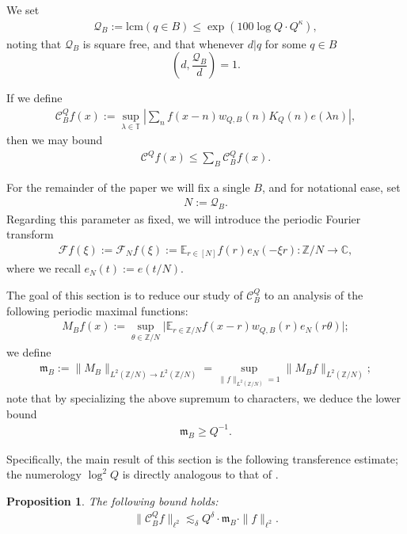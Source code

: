 \documentclass[12pt]{amsart}
\numberwithin{equation}{section}
\newtheorem{proposition}[theorem]{Proposition}
\theoremstyle{definition}
\begin{document}
We set
\begin{align}
\mathcal{Q}_B := \text{lcm}(q \in B) \leq \exp(100 \log Q \cdot Q^\kappa),
\end{align}
noting that $\mathcal{Q}_B$ is square free, and that whenever $d|q$ for some $q \in B$
\[ (d, \frac{\mathcal{Q}_B}{d}) =1.\]

If we define
\begin{align}
    \mathcal{C}^{Q}_Bf(x):= \sup_{\lambda \in \mathbb{T}}| \sum_n  f(x-n) w_{Q,B}(n)K_Q(n) e(\lambda n)|,
\end{align}
then we may bound
\begin{align}
    \mathcal{C}^Q f(x) \leq \sum_B \mathcal{C}^{Q}_Bf(x).
\end{align}

For the remainder of the paper we will fix a single $B$, and for notational ease, set
\begin{align}
    N := \mathcal{Q}_B.
\end{align}
Regarding this parameter as fixed, we will introduce the periodic Fourier transform
\begin{align}
\mathcal{F} f(\xi) := \mathcal{F}_N f(\xi) := \mathbb{E}_{r \in [N]} f(r) e_N(-\xi r) : \mathbb{Z}/N \to \mathbb{C},
\end{align}
where we recall $e_N(t) := e(t/N)$.

The goal of this section is to reduce our study of $\mathcal{C}^Q_B$ to an analysis of the following periodic maximal functions:
\begin{align}
    M_B f(x) := \sup_{\theta \in \mathbb{Z}/N} \big| \mathbb{E}_{r \in \mathbb{Z}/N} f(x-r) w_{Q,B}(r) e_N(r \theta) \big|;
\end{align}
we define
\begin{align}
    \mathfrak m_B := \|M_B\|_{L^2(\mathbb{Z}/N)\to L^2(\mathbb{Z}/N)}
    = \sup_{\| f \|_{L^2(\mathbb{Z}/N)} = 1} \| M_B f \|_{L^2(\mathbb{Z}/N)};
\end{align}
note that by specializing the above supremum to characters, we deduce the lower bound
\begin{align}
\mathfrak m_B \geq Q^{-1}.
\end{align}

Specifically, the main result of this section is the following transference estimate; the numerology $\log^2 Q$ is directly analogous to that of \cite{B2}.

\begin{proposition}\label{p:transferprop}
The following bound holds:
\begin{align} 
\| \mathcal{C}_B^Q f \|_{\ell^2} \lesssim_{\delta} Q^{\delta} \cdot \mathfrak m_B \cdot \|f \|_{\ell^2}.
\end{align}
\end{proposition}
\end{document}

